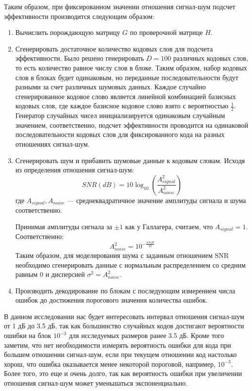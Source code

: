 Таким образом, при фиксированном значении отношения сигнал-шум подсчет эффективности
производится следующим образом:

\begin{enumerate}
	\item Вычислить порождающую матрицу $G$ по проверочной матрице $H$.
	\item Сгенерировать достаточное количество кодовых слов для подсчета эффективности.
	Было решено генерировать $D=100$ различных кодовых слов, то есть количество равное числу слов в
	блоке. Таким образом, набор кодовых слов в блоках будет одинаковым, но переданные последовательности
	будут разными за счет различных шумовых данных.
	Каждое случайно сгенерированное кодовое слово является линейной комбинацией базисных кодовых
	слов, где каждое базисное кодовое слово взято с вероятностью $\frac{1}{2}$. Генератор случайных 
	чисел инициализируется одинаковым случайным значением, соответственно, подсчет эффективности
	проводится на одинаковой последовательности кодовых слов для фиксированного кода на разных
	отношениях сигнал-шум.
	\item Сгенерировать шум и прибавить шумовые данные к кодовым словам. Исходя из определения
	отношения сигнал-шум:
	\[
		SNR(dB)=10\log_{10}\left(\frac{A_{signal}^2}{A_{noise}^2}\right)
	\]
	где $A_{signal},A_{noise}$ --- среднеквадратичное значение амплитуды сигнала и шума соответственно. 
	
	Принимая амплитуды сигнала за $\pm1$ как у Галлагера, считаем, что $A_{signal}=1$. Соответственно:
	\[
		A_{noise}^2 = 10^{-\frac{SNR}{10}} 
	\]
	Таким образом, для моделирования шума с заданным отношением SNR необходимо сгенерировать
	данные с нормальным распределением со средним равным $0$ и дисперсией $\sigma^2=A_{noise}^2$.
	\item Производить декодирование по блокам с последующим измерением числа ошибок до достижения
	порогового значения количества ошибок.
\end{enumerate}

В данном исследовании нас будет интересовать интервал 
отношения сигнал-шум от 1 дБ до 3.5 дБ, так как большинство
случайных кодов достигают вероятности ошибки на блок $10^{-3}$
для исследуемых размеров ранее 3.5 дБ. Кроме того заметим,
что нет необходимости измерять вероятность ошибки
для кода при большем отношении
сигнал-шум, если при текущем отношении код настолько хорош,
что ошибка оказывается менее некоторой пороговой, например,
$10^{-3}$. Более того, это еще и очень долго,
так как вероятность ошибки при увеличении отношения сигнал-шум
может уменьшаться экспоненциально.

